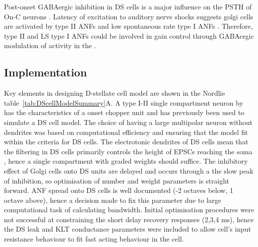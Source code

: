 
Post-onset GABAergic inhibition in DS cells is a major influence on the PSTH of
On-C neurons \citep{FerragamoGoldingEtAl:1998a,EvansZhao:1998}. Latency of
excitation to auditory nerve shocks suggests golgi cells are activated by type
II ANFs and low spontaneous rate type I ANFs \citep{BensonBerglundEtAl:1996,
  FerragamoGoldingEtAl:1998}. Therefore, type II and LS type I ANFs could be
involved in gain control through GABAergic modulation of activity in the \VCN.






\subsection{Implementation}
 
Key elements in designing D-stellate cell model are
shown in the Nordlie table~\ref{tab:DScellModelSummary}A. A type I-II single
compartment neuron by \citet{RothmanManis:2003b} has the characteristics of a
onset chopper unit and has previously been used to simulate a DS cell model. The
choice of having a large multipolar neuron without dendrites was based on
computational efficiency and ensuring that the model fit within the criteria for
DS cells. The electrotonic dendrites of DS cells mean that the filtering in DS
cells primarily controls the height of EPSCs reaching the soma
\citep{WhiteYoungEtAl:1994}, hence a single compartment with graded weights
should suffice. The inhibitory effect of Golgi cells onto DS units are delayed and occurs
through a the slow peak of \GABAa inhibition, so optimisation of number and
weight parameters is straight forward. ANF spread onto DS cells is well
documented (-2 octaves below, 1 octave above), hence a decision made to fix this
parameter due to large computational task of calculating bandwidth. Initial
optimisation procedures were not successful at constraining the short delay
recovery responses (2,3,4 ms), hence the DS leak and KLT conductance parameters
were included to allow cell's input resistance behaviour to fit fast acting
behaviour in the cell.

